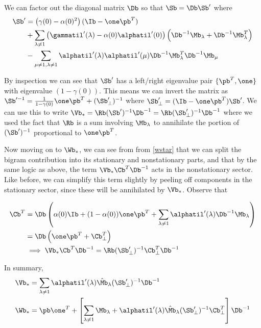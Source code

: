 \documentclass{article}
\begin{document}
We can factor out the diagonal matrix $\Db$ so that $\Sb = \Db\Sb'$ where 
\begin{align*}
    \Sb' &= \left(\gamma(0) - \alpha(0)^2\right)(\Ib - \one\pb^T) \\
     &+ \sum_{\lambda \neq 1}\left( \gammatil'(\lambda) - \alpha(0)\alphatil'(0)\right ) \left( \Db^{-1}\Mb_\lambda + \Db^{-1}\Mb_\lambda^T\right) \\
     &- \sum_{\mu\neq 1, \lambda\neq 1} \alphatil'(\lambda)\alphatil'(\mu)\Db^{-1}\Mb_\lambda^T \Db^{-1}\Mb_\mu
\end{align*}

By inspection we can see that $\Sb'$ has a left/right eigenvalue pair $\{\pb^T, \one \}$ with eigenvalue $(1 - \gamma(0))$. This means we can invert the matrix as $\Sb'^{-1} = \frac{1}{1 - \gamma(0)}\one \pb^T + (\Sb'_\perp)^{-1}$ where $\Sb'_\perp = (\Ib - \one \pb^T)\Sb'$. We can use this to write $\Vb_* = \Rb (\Sb')^{-1}\Db^{-1} =  \Rb (\Sb'_\perp)^{-1}\Db^{-1}$ where we used the fact that $\Rb$ is a sum involving $\Mb_\lambda$ to annihilate the portion of $(\Sb')^{-1}$ proportional to $\one \pb^T$. 

Now moving on to $\Wb_*$, we can see from from \eqref{wstar} that we can split the bigram contribution into its stationary and nonstationary parts, and that by the same logic as above, the term $\Vb_*\Cb^T\Db^{-1}$ acts in the nonstationary sector. Like before, we can simplify this term slightly by peeling off components in the stationary sector, since these will be annihilated by $\Vb_*$. Observe that 

\begin{align}
    \Cb^T &= \Db\left(\alpha(0)\Ib + (1 - \alpha(0))\one\pb^T + \sum_{\lambda \neq 1}\alphatil'(\lambda)\Db^{-1}\Mb_\lambda\right) \\
    &= \Db \left (\one \pb^T + \Cb_\perp^T \right) \\
    &\implies \Vb_* \Cb^T\Db^{-1} = \Rb (\Sb_\perp')^{-1} \Cb_\perp^T \Db^{-1}
\end{align}

In summary, 
\begin{align}
    \Vb_* &= \sum_{\lambda\neq 1} \alphatil'(\lambda) \hat{\Mb}_\lambda (\Sb'_\perp)^{-1}\Db^{-1} \\
    \Wb_* &= \pb\one^T + \left[\sum_{\lambda \neq 1} \Mb_\lambda + \alphatil'(\lambda) \hat{\Mb}_\lambda (\Sb'_\perp)^{-1}\Cb_\perp^T\right] \Db^{-1}
\end{align}
\end{document}
